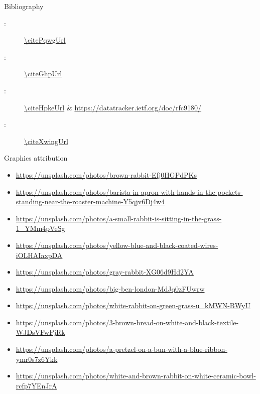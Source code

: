 
\begin{frame}{Bibliography}
  \begin{description}
    \item[\citePqwg:] \url{\citePqwgUrl}
    \item[\citeGhp:] \url{\citeGhpUrl}
    \item[\citeHpke:] \url{\citeHpkeUrl} \& \url{https://datatracker.ietf.org/doc/rfc9180/}
    \item[\citeXwing:] \url{\citeXwingUrl}
  \end{description}
\end{frame}

\begin{frame}{Graphics attribution}
  \tiny
  \begin{itemize}
    \item \url{https://unsplash.com/photos/brown-rabbit-Efj0HGPdPKs}
    \item \url{https://unsplash.com/photos/barista-in-apron-with-hands-in-the-pockets-standing-near-the-roaster-machine-Y5qjv6Dj4w4}
    \item \url{https://unsplash.com/photos/a-small-rabbit-is-sitting-in-the-grass-1_YMm4pVeSg}
    \item \url{https://unsplash.com/photos/yellow-blue-and-black-coated-wires-iOLHAIaxpDA}
    \item \url{https://unsplash.com/photos/gray-rabbit-XG06d9Hd2YA}
    \item \url{https://unsplash.com/photos/big-ben-london-MdJq0zFUwrw}
    \item \url{https://unsplash.com/photos/white-rabbit-on-green-grass-u_kMWN-BWyU}
    \item \url{https://unsplash.com/photos/3-brown-bread-on-white-and-black-textile-WJDsVFwPjRk}
    \item \url{https://unsplash.com/photos/a-pretzel-on-a-bun-with-a-blue-ribbon-ymr0s7z6Ykk}
    \item \url{https://unsplash.com/photos/white-and-brown-rabbit-on-white-ceramic-bowl-rcfp7YEnJrA}
  \end{itemize}
\end{frame}
